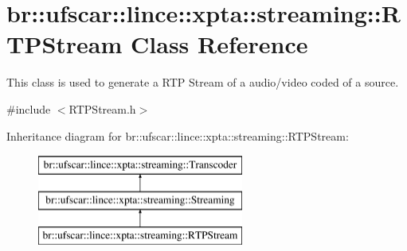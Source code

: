 \hypertarget{classbr_1_1ufscar_1_1lince_1_1xpta_1_1streaming_1_1RTPStream}{
\section{br::ufscar::lince::xpta::streaming::RTPStream Class Reference}
\label{classbr_1_1ufscar_1_1lince_1_1xpta_1_1streaming_1_1RTPStream}
}


This class is used to generate a RTP Stream of a audio/video coded of a source.  




{\ttfamily \#include $<$RTPStream.h$>$}

Inheritance diagram for br::ufscar::lince::xpta::streaming::RTPStream:\begin{figure}[H]
\begin{center}
\leavevmode
\includegraphics[height=3cm]{classbr_1_1ufscar_1_1lince_1_1xpta_1_1streaming_1_1RTPStream}
\end{center}
\end{figure}
